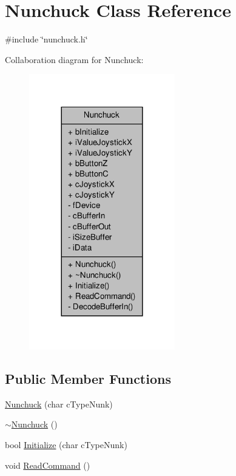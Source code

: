 \hypertarget{classNunchuck}{\section{Nunchuck Class Reference}
\label{classNunchuck}
}


{\ttfamily \#include \char`\"{}nunchuck.\-h\char`\"{}}



Collaboration diagram for Nunchuck\-:\nopagebreak
\begin{figure}[H]
\begin{center}
\leavevmode
\includegraphics[width=180pt]{classNunchuck__coll__graph}
\end{center}
\end{figure}
\subsection*{Public Member Functions}
\begin{DoxyCompactItemize}
\item 
\hyperlink{classNunchuck_a655b8b1dcb8afcb60b44fcd5ab328407}{Nunchuck} (char c\-Type\-Nunk)
\item 
\hyperlink{classNunchuck_a2ff51de933f8099585f36eee2f280b38}{$\sim$\-Nunchuck} ()
\item 
bool \hyperlink{classNunchuck_aabc3105bbe185edb4521506e5da3dc48}{Initialize} (char c\-Type\-Nunk)
\item 
void \hyperlink{classNunchuck_ade6607a55fda6ae67c90d3d1ee7ce56b}{Read\-Command} ()
\end{DoxyCompactItemize}
